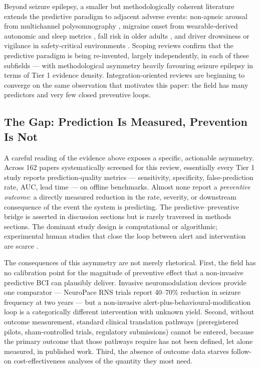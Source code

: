 Beyond seizure epilepsy, a smaller but methodologically coherent literature extends the predictive paradigm to adjacent adverse events: non-apneic arousal from multichannel polysomnography \cite{JamaraniEtAl2026}, migraine onset from wearable-derived autonomic and sleep metrics \cite{TomalinEtAl2025,KapustynskaEtAl2024,KapustynskaEtAl2025,JankevičiūtėEtAl2026}, fall risk in older adults \cite{MaioraEtAl2024,ChanEtAl2023,Al-HammouriEtAl2025,CavanaghEtAl2024,GuanEtAl2025,LinEtAl2025,ZhangEtAl2024,LiaoEtAl2025b}, and driver drowsiness or vigilance in safety-critical environments \cite{TheivadasPonnan2025,SchwarzEtAl2023,Al-QuraishiEtAl2024,ZhangEtAl2025}. Scoping reviews \cite{HrubýEtAl2026,MouEtAl2026,MehrlatifanMolla2024,VelasquezEtAl2024} confirm that the predictive paradigm is being re-invented, largely independently, in each of these subfields --- with methodological asymmetry heavily favouring seizure epilepsy in terms of Tier 1 evidence density. Integration-oriented reviews \cite{WesalEtAl2026,QamarEtAl2025} are beginning to converge on the same observation that motivates this paper: the field has many predictors and very few closed preventive loops.

\subsection{The Gap: Prediction Is Measured, Prevention Is Not}
\label{sec:intro-gap}

A careful reading of the evidence above exposes a specific, actionable asymmetry. Across 162 papers systematically screened for this review, essentially every Tier 1 study reports prediction-quality metrics --- sensitivity, specificity, false-prediction rate, AUC, lead time --- on offline benchmarks. Almost none report a \emph{preventive outcome}: a directly measured reduction in the rate, severity, or downstream consequence of the event the system is predicting. The predictive--preventive bridge is asserted in discussion sections \cite{NasseriEtAl2021,YedurkarEtAl2025,WesalEtAl2026} but is rarely traversed in methods sections. The dominant study design is computational or algorithmic; experimental human studies that close the loop between alert and intervention are scarce \cite{WesalEtAl2026}.

The consequences of this asymmetry are not merely rhetorical. First, the field has no calibration point for the magnitude of preventive effect that a non-invasive predictive BCI can plausibly deliver. Invasive neuromodulation devices provide one comparator --- NeuroPace RNS trials report 40--70\% reduction in seizure frequency at two years --- but a non-invasive alert-plus-behavioural-modification loop is a categorically different intervention with unknown yield. Second, without outcome measurement, standard clinical translation pathways (preregistered pilots, sham-controlled trials, regulatory submissions) cannot be entered, because the primary outcome that those pathways require has not been defined, let alone measured, in published work. Third, the absence of outcome data starves follow-on cost-effectiveness analyses \cite{VelasquezEtAl2024} of the quantity they most need.

